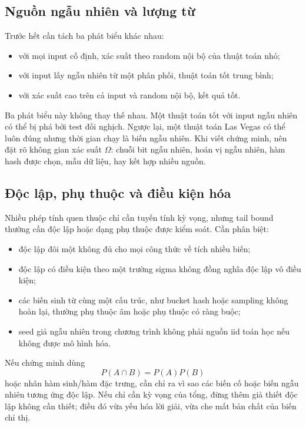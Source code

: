 \documentclass[11pt]{article}
\begin{document}
\subsection{Nguồn ngẫu nhiên và lượng từ}

Trước hết cần tách ba phát biểu khác nhau:
\begin{itemize}
  \item với mọi input cố định, xác suất theo random nội bộ của thuật toán nhỏ;
  \item với input lấy ngẫu nhiên từ một phân phối, thuật toán tốt trung bình;
  \item với xác suất cao trên cả input và random nội bộ, kết quả tốt.
\end{itemize}

Ba phát biểu này không thay thế nhau. Một thuật toán tốt với input ngẫu nhiên có
thể bị phá bởi test đối nghịch. Ngược lại, một thuật toán Las Vegas có thể luôn
đúng nhưng thời gian chạy là biến ngẫu nhiên. Khi viết chứng minh, nên đặt rõ
không gian xác suất \(\Omega\): chuỗi bit ngẫu nhiên, hoán vị ngẫu nhiên, hàm
hash được chọn, mẫu dữ liệu, hay kết hợp nhiều nguồn.

\subsection{Độc lập, phụ thuộc và điều kiện hóa}

Nhiều phép tính quen thuộc chỉ cần tuyến tính kỳ vọng, nhưng tail bound thường
cần độc lập hoặc dạng phụ thuộc được kiểm soát. Cần phân biệt:
\begin{itemize}
  \item độc lập đôi một không đủ cho mọi công thức về tích nhiều biến;
  \item độc lập có điều kiện theo một trường sigma không đồng nghĩa độc lập vô
        điều kiện;
  \item các biến sinh từ cùng một cấu trúc, như bucket hash hoặc sampling không
        hoàn lại, thường phụ thuộc âm hoặc phụ thuộc có ràng buộc;
  \item seed giả ngẫu nhiên trong chương trình không phải nguồn iid toán học nếu
        không được mô hình hóa.
\end{itemize}

Nếu chứng minh dùng
\[
  P(A\cap B)=P(A)P(B)
\]
hoặc nhân hàm sinh/hàm đặc trưng, cần chỉ ra vì sao các biến cố hoặc biến ngẫu
nhiên tương ứng độc lập. Nếu chỉ cần kỳ vọng của tổng, đừng thêm giả thiết độc
lập không cần thiết; điều đó vừa yếu hóa lời giải, vừa che mất bản chất của
biến chỉ thị.
\end{document}
